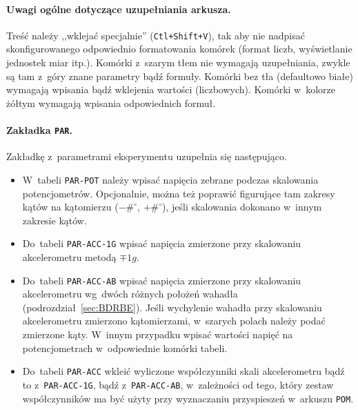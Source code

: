 \documentclass[paper=a4,DIV=12]{lpas}
\begin{document}
\paragraph{Uwagi ogólne dotyczące uzupełniania arkusza.} Treść należy
,,wklejać specjalnie'' (\texttt{Ctl+Shift+V}), tak aby nie nadpisać
skonfigurowanego odpowiednio formatowania komórek (format liczb, wyświetlanie
jednostek miar itp.). Komórki z~szarym tłem nie wymagają uzupełniania, zwykle
są tam z~góry znane parametry bądź formuły. Komórki bez tła (defaultowo białe)
wymagają wpisania bądź wklejenia wartości (liczbowych). Komórki w~kolorze
żółtym wymagają wpisania odpowiednich formuł.

\paragraph{Zakładka \texttt{PAR}.} Zakładkę z~parametrami eksperymentu
uzupełnia się następująco.
\begin{itemize}
  \item W~tabeli \texttt{PAR-POT} należy wpisać napięcia zebrane podczas
    skalowania potencjometrów. Opcjonalnie, można też poprawić figurujące tam
    zakresy kątów na kątomierzu ($-\#^{\circ}$, $+\#^{\circ}$), jeśli
    skalowania dokonano w~innym zakresie kątów.
  \item Do~tabeli \texttt{PAR-ACC-1G} wpisać napięcia zmierzone przy
    skalowaniu akcelerometru metodą $\mp 1g$.
  \item Do~tabeli \texttt{PAR-ACC-AB} wpisać napięcia zmierzone przy skalowaniu
    akcelerometru wg~dwóch różnych położeń wahadła
    (podrozdział~\ref{sec:BDRBE}). Jeśli wychylenie wahadła przy skalowaniu
    akcelerometru zmierzono kątomierzami, w~szarych polach należy podać
    zmierzone kąty. W~innym przypadku wpisać wartości napięć na potencjometrach
    w~odpowiednie komórki tabeli.
  \item Do~tabeli \texttt{PAR-ACC} wkleić wyliczone współczynniki skali
    akcelerometru bądź to z~\texttt{PAR-ACC-1G}, bądź z~\texttt{PAR-ACC-AB},
    w~zależności od tego, który zestaw współczynników ma być użyty przy
    wyznaczaniu przyspieszeń w~arkuszu \texttt{POM}.
\end{itemize}
\end{document}
